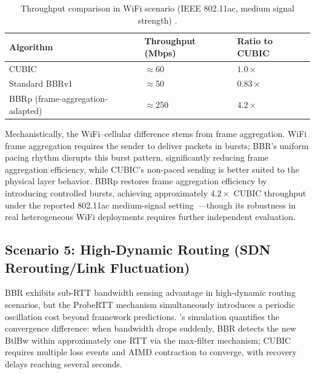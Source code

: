 \documentclass[a4paper,fleqn]{cas-sc}
\begin{document}
\begin{table}[pos=htbp]
  \caption{Throughput comparison in WiFi scenario (IEEE 802.11ac, medium signal
    strength) \citep{grazia2020bbrp}.}
  \label{tab:wifi}
  \small
  \begin{tabularx}{\tblwidth}{@{}lXX@{}}
    \toprule
    \textbf{Algorithm} & \textbf{Throughput (Mbps)} & \textbf{Ratio to CUBIC} \\
    \midrule
    CUBIC                   & $\approx$60  & $1.0\times$ \\
    Standard BBRv1          & $\approx$50  & $0.83\times$ \\
    BBRp (frame-aggregation-adapted) & $\approx$250 & $4.2\times$ \\
    \bottomrule
  \end{tabularx}
\end{table}

Mechanistically, the WiFi--cellular difference stems from frame aggregation.
WiFi frame aggregation requires the sender to deliver packets in bursts; BBR's
uniform pacing rhythm disrupts this burst pattern, significantly reducing frame
aggregation efficiency, while CUBIC's non-paced sending is better suited to the
physical layer behavior. BBRp restores frame aggregation efficiency by introducing
controlled bursts, achieving approximately $4.2\times$ CUBIC throughput under the
reported 802.11ac medium-signal setting~\citep{grazia2020bbrp}---though its robustness in real heterogeneous WiFi deployments requires
further independent evaluation.

\FloatBarrier

\subsection{Scenario 5: High-Dynamic Routing (SDN Rerouting/Link Fluctuation)}
\label{sec:sdn}

BBR exhibits sub-RTT bandwidth sensing advantage in high-dynamic routing scenarios,
but the ProbeRTT mechanism simultaneously introduces a periodic oscillation cost
beyond framework predictions. \citet{miyazawa2018cyclic}'s simulation quantifies
the convergence difference: when bandwidth drops suddenly, BBR detects the new
BtlBw within approximately one RTT via the max-filter mechanism; CUBIC requires
multiple loss events and AIMD contraction to converge, with recovery delays
reaching several seconds.
\end{document}
